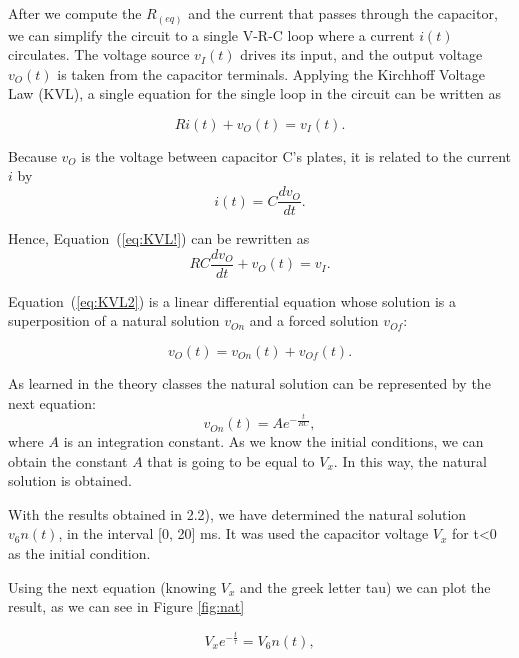 After we compute the $R_(eq)$ and the current that passes through the capacitor, we can simplify the circuit to a  single V-R-C loop where a current $i(t)$ circulates. The
voltage source $v_I(t)$ drives its input, and the output voltage $v_O(t)$ is taken from
the capacitor terminals. Applying the Kirchhoff Voltage Law (KVL), a single
equation for the single loop in the circuit can be written as

\begin{equation}
  Ri(t) + v_O(t) = v_I(t).
  \label{eq:KVL1}
\end{equation}

Because $v_O$ is the voltage between capacitor C's plates, it is related to the
current $i$ by
\begin{equation}
  i(t) = C\frac{dv_O}{dt}.
\end{equation}

Hence, Equation~(\ref{eq:KVL!}) can be rewritten as
\begin{equation}
  RC\frac{dv_O}{dt} + v_O(t) = v_I.
  \label{eq:KVL2}
\end{equation}

Equation~(\ref{eq:KVL2}) is a linear differential equation whose solution is a
superposition of a natural solution $v_{On}$ and a forced solution $v_{Of}$:

\begin{equation}
  v_O(t) = v_{On}(t) + v_{Of}(t).
  \label{eq:vo_sobreposição}
\end{equation}

As learned in the theory classes the natural solution can be represented by the next equation:
\begin{equation}
  v_{On}(t) = Ae^{-\frac{t}{RC}},
  \label{eq:vo_nat}
\end{equation}
where $A$ is an integration constant.
As we know the initial conditions, we can obtain the constant $A$ that is going to be equal to $V_x$. In this way, the natural solution is obtained.

With the results obtained in 2.2),  we have determined the natural solution $v_6n(t)$, in the interval [0, 20] ms. It was used the capacitor voltage $V_x$ for t\textless0 as the initial condition.

Using the next equation (knowing $V_x$ and the greek letter tau) we can plot the result, as we can see in Figure \ref{fig:nat}

\begin{equation}
  V_xe^{-\frac{t}{{\displaystyle \tau }}}=V_6n(t),
  \label{eq:vo_nat}
\end{equation}

